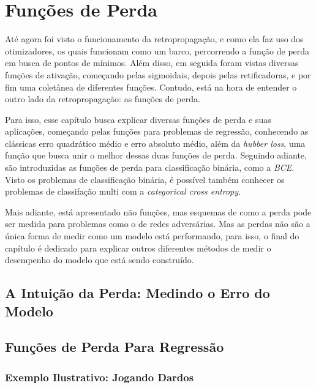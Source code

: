 
\chapter{Funções de Perda}
\label{cap:perda-binaria}

Até agora foi visto o funcionamento da retropropagação, e como ela faz uso dos otimizadores, os quais funcionam como um barco, percorrendo a função de perda em busca de pontos de mínimos. Além disso, em seguida foram vistas diversas funções de ativação, começando pelas sigmoidais, depois pelas retificadoras, e por fim uma coletânea de diferentes funções. Contudo, está na hora de entender o outro lado da retropropagação: as funções de perda.

Para isso, esse capítulo busca explicar diversas funções de perda e suas aplicações, começando pelas funções para problemas de regressão, conhecendo as clássicas erro quadrático médio e erro absoluto médio, além da \textit{hubber loss}, uma função que busca unir o melhor dessas duas funções de perda. Seguindo adiante, são introduzidas as funções de perda para classificação binária, como a \textit{BCE}. Visto os problemas de classificação binária, é possível também conhecer os problemas de classifação multi com a \textit{categorical cross entropy}.

Mais adiante, está apresentado não funções, mas esquemas de como a perda pode ser medida para problemas como o de redes adversárias. Mas as perdas não são a única forma de medir como um modelo está performando, para isso, o final do capítulo é dedicado para explicar outros diferentes métodos de medir o desempenho do modelo que está sendo construído.

\section{A Intuição da Perda: Medindo o Erro do Modelo}

\section{Funções de Perda Para Regressão}

\subsection{Exemplo Ilustrativo: Jogando Dardos}

